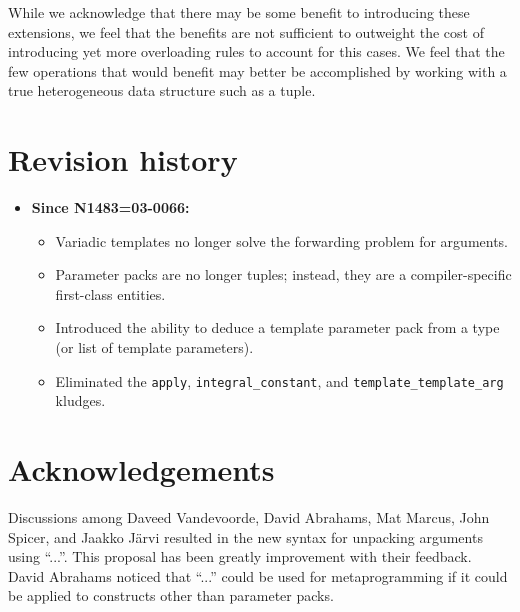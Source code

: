 \documentclass{article}
\begin{document}
While we acknowledge that there may be some benefit to introducing
these extensions, we feel that the benefits are not sufficient to
outweight the cost of introducing yet more overloading rules to
account for this cases. We feel that the few operations that would
benefit may better be accomplished by working with a true
heterogeneous data structure such as a tuple.

\section{Revision history}
\begin{itemize}
\item \textbf{Since N1483=03-0066:} 
  \begin{itemize}
  \item Variadic templates no longer solve the forwarding problem for
    arguments. 
  \item Parameter packs are no longer tuples; instead, they are a
    compiler-specific first-class entities.
  \item Introduced the ability to deduce a template parameter pack
    from a type (or list of template parameters).
  \item Eliminated the \texttt{apply}, \texttt{integral\_constant},
    and \texttt{template\_template\_arg} kludges.
  \end{itemize}
\end{itemize}

\section{Acknowledgements}
Discussions among Daveed Vandevoorde, David Abrahams, Mat Marcus, John
Spicer, and Jaakko J\"arvi resulted in the new syntax for
unpacking arguments using ``...''. This proposal has been greatly
improvement with their feedback. David Abrahams noticed that ``...''
could be used for metaprogramming if it could be applied to constructs
other than parameter packs. 



\end{document}

